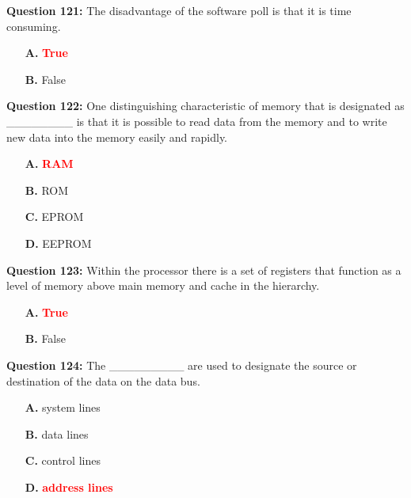 \documentclass[12pt,a4paper]{article}
\begin{document}
\vspace{0.5cm}

\textbf{Question 121:} The disadvantage of the software poll is that it is time consuming.

\begin{itemize}
    \item[\textbf{A.}] \textcolor{red}{\textbf{True}}
    \item[\textbf{B.}] False
\end{itemize}

\vspace{0.5cm}

\textbf{Question 122:} One distinguishing characteristic of memory that is designated as ________ is that it is possible to read data from the memory and to write new data into the memory easily and rapidly.

\begin{itemize}
    \item[\textbf{A.}] \textcolor{red}{\textbf{RAM}}
    \item[\textbf{B.}] ROM
    \item[\textbf{C.}] EPROM
    \item[\textbf{D.}] EEPROM
\end{itemize}

\vspace{0.5cm}

\textbf{Question 123:} Within the processor there is a set of registers that function as a level of memory above main memory and cache in the hierarchy.

\begin{itemize}
    \item[\textbf{A.}] \textcolor{red}{\textbf{True}}
    \item[\textbf{B.}] False
\end{itemize}

\vspace{0.5cm}

\textbf{Question 124:} The _________ are used to designate the source or destination of the data on the data bus.

\begin{itemize}
    \item[\textbf{A.}] system lines
    \item[\textbf{B.}] data lines
    \item[\textbf{C.}] control lines
    \item[\textbf{D.}] \textcolor{red}{\textbf{address lines}}
\end{itemize}
\end{document}
